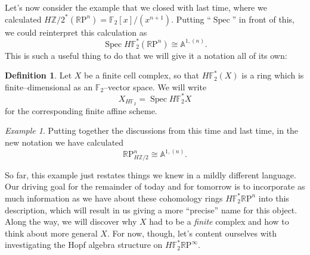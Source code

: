 \documentclass{article}
\newcommand{\Z}{\mathbb Z}
\newcommand{\F}{\mathbb F}
\newcommand{\R}{\mathbb R}
\newcommand{\RP}{\R\mathrm P}
\newcommand{\<}{\langle}
\renewcommand{\>}{\rangle}
\DeclareMathOperator{\Spec}{Spec}
\numberwithin{equation}{section}
\theoremstyle{plain}
\theoremstyle{definition}
\newtheorem{definition}[equation]{Definition}
\theoremstyle{remark}
\newtheorem{example}[equation]{Example}
\begin{document}
Let's now consider the example that we closed with last time, where we calculated $H\Z/2^*(\RP^n) = \F_2[x] / (x^{n+1})$.  Putting ``$\Spec$'' in front of this, we could reinterpret this calculation as \[\Spec H\F_2^*(\RP^n) \cong \mathbb A^{1, (n)}.\]  This is such a useful thing to do that we will give it a notation all of its own:

\begin{definition}
Let $X$ be a finite cell complex, so that $H\F_2^*(X)$ is a ring which is finite--dimensional as an $\F_2$--vector space.  We will write \[X_{H\F_2} = \Spec H\F_2^* X\] for the corresponding finite affine scheme.
\end{definition}

\begin{example}
Putting together the discussions from this time and last time, in the new notation we have calculated \[\RP^n_{H\Z/2} \cong \mathbb A^{1, (n)}.\]
\end{example}

So far, this example just restates things we knew in a mildly different language.  Our driving goal for the remainder of today and for tomorrow is to incorporate as much information as we have about these cohomology rings $H\F_2^* \RP^n$ into this description, which will result in us giving a more ``precise'' name for this object.  Along the way, we will discover why $X$ had to be a \emph{finite} complex and how to think about more general $X$.  For now, though, let's content ourselves with investigating the Hopf algebra structure on $H\F_2^* \RP^\infty$.
\end{document}
